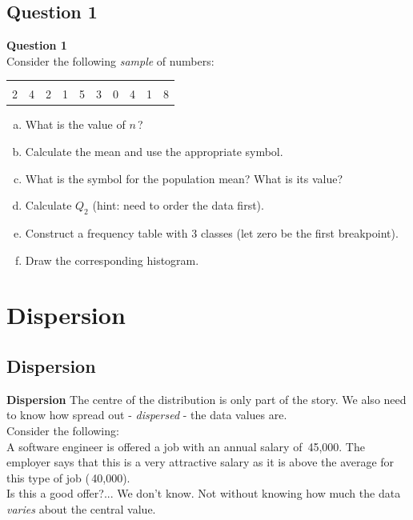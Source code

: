 \documentclass[compress]{beamer}        %
\makeatletter
\newcommand{\tcb}{\textcolor{beamer@blendedblue}}
\makeatother
\begin{document}
\subsection{Question 1}
\begin{frame}{\bf \tcb{Question 1}\\[-0.8cm]}
Consider the following \emph{sample} of numbers:
\begin{center}
\begin{tabular}{|cccccccccc|}
\hline
&&&&&&&&&\\[-0.4cm]
2 & 4 & 2 & 1 & 5 & 3 & 0 & 4 & 1 & 8 \\
\hline
\end{tabular}
\end{center}
\begin{enumerate}[a)]\itemsep0.3cm
\item What is the value of $n$\,?
\item Calculate the mean and use the appropriate symbol.
\item What is the symbol for the population mean? What is its value?
\item Calculate $Q_2$ (hint: need to order the data first).
\item Construct a frequency table with 3 classes (let zero be the first breakpoint).
\item Draw the corresponding histogram.
\end{enumerate}
\end{frame}



\section{Dispersion\hspace{0.9cm}}
\subsection{Dispersion}
\begin{frame}{\bf \tcb{Dispersion}}
The centre of the distribution is only part of the story. We also need to know how spread out - \emph{dispersed} - the data values are.\\[0.8cm]

Consider the following:\\[0.4cm]

A software engineer is offered a job with an annual salary of \texteuro\,45,000. The employer says that this is a very attractive salary as it is above the average for this type of job (\texteuro\,40,000).\\[0.4cm]
Is this a good offer?... We don't know. Not without knowing how much the data \emph{varies} about the central value.
\end{frame}
\end{document}
